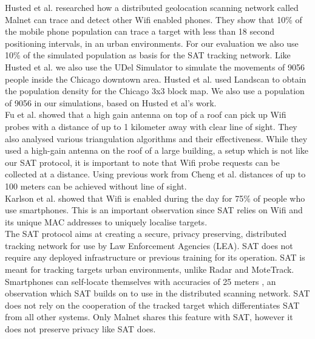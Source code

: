 \documentclass[10pt,titlepage]{article}
\begin{document}
Husted et al. \cite{MALNET} researched how a distributed geolocation scanning network called Malnet can trace and detect other Wifi enabled phones. They show that 10\% of the mobile phone population can trace a target with less than 18 second positioning intervals, in an urban environments. For our evaluation we also use 10\% of the simulated population as basis for the SAT tracking network. Like Husted et al. we also use the UDel Simulator to simulate the movements of 9056 people inside the Chicago downtown area. Husted et al. used Landscan to obtain the population density for the Chicago 3x3 block map. We also use a population of 9056 in our simulations, based on Husted et al's work.\\

Fu et al. \cite{MAURAUDER} showed that a high gain antenna on top of a roof can pick up Wifi probes with a distance of up to 1 kilometer away with clear line of sight. They also analysed various triangulation algorithms and their effectiveness. While they used a high-gain antenna on the roof of a large building, a setup which is not like our SAT protocol, it is important to note that Wifi probe requests can be collected at a distance. Using previous work from Cheng et al. \cite{CHENG} distances of up to 100 meters can be achieved without line of sight.\\

Karlson et al. \cite{WORKINGOVERTIME} showed that Wifi is enabled during the day for 75\% of people who use smartphones. This is an important observation since SAT relies on Wifi and its unique MAC addresses to uniquely localise targets.\\

The SAT protocol aims at creating a secure, privacy preserving, distributed tracking network for use by Law Enforcement Agencies (LEA). SAT does not require any deployed infrastructure or previous training for its operation. SAT is meant for tracking targets urban environments, unlike Radar and MoteTrack. Smartphones can self-locate themselves with accuracies of 25 meters \cite{CHENG}, an observation which SAT builds on to use in the distributed scanning network. SAT does not rely on the cooperation of the tracked target which differentiates SAT from all other systems. Only Malnet \cite{MALNET} shares this feature with SAT, however it does not preserve privacy like SAT does.\\
\end{document}
